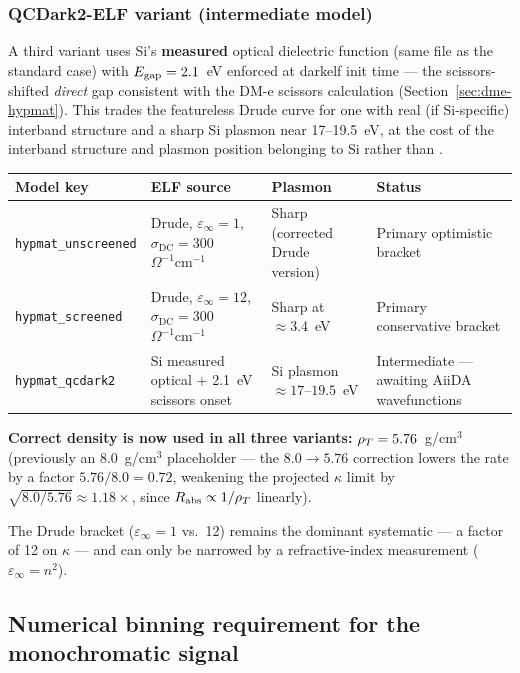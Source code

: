 \subsubsection{QCDark2-ELF variant (intermediate model)}

A third variant uses Si's \textbf{measured} optical dielectric function
(same file as the standard case) with $E_\mathrm{gap}=2.1$~eV enforced at darkelf
init time — the scissors-shifted \emph{direct} gap consistent with the
DM-e scissors calculation (Section~\ref{sec:dme-hypmat}). This trades the
featureless Drude curve for one with real (if Si-specific) interband
structure and a sharp Si plasmon near 17--19.5~eV, at the cost of the
interband structure and plasmon position belonging to Si rather than
\SrCdSb{}.

\begin{center}
\begin{tabular}{@{}p{2.8cm}p{5.3cm}p{2.7cm}p{2.7cm}@{}}
\toprule
Model key & ELF source & Plasmon & Status \\
\midrule
\texttt{hypmat\_unscreened} & Drude, $\varepsilon_\infty=1$,
  $\sigma_\mathrm{DC}=300$~$\Omega^{-1}\mathrm{cm}^{-1}$ & Sharp (corrected
  Drude version) & Primary optimistic bracket \\
\texttt{hypmat\_screened} & Drude, $\varepsilon_\infty=12$,
  $\sigma_\mathrm{DC}=300$~$\Omega^{-1}\mathrm{cm}^{-1}$ & Sharp at
  $\approx3.4$~eV & Primary conservative bracket \\
\texttt{hypmat\_qcdark2} & Si measured optical + 2.1~eV scissors onset &
  Si plasmon $\approx17$--$19.5$~eV & Intermediate — awaiting AiiDA
  wavefunctions \\
\bottomrule
\end{tabular}
\end{center}

\textbf{Correct density is now used in all three variants:}
$\rho_T=5.76$~g/cm$^3$ (previously an 8.0~g/cm$^3$ placeholder — the
$8.0\to5.76$ correction lowers the rate by a factor $5.76/8.0=0.72$,
weakening the projected $\kappa$ limit by $\sqrt{8.0/5.76}\approx1.18\times$,
since $R_\mathrm{abs}\propto1/\rho_T$ linearly).

The Drude bracket ($\varepsilon_\infty=1$ vs.\ 12) remains the dominant
systematic — a factor of 12 on $\kappa$ — and can only be narrowed by a
refractive-index measurement ($\varepsilon_\infty=n^2$).

\subsection{Numerical binning requirement for the monochromatic signal}
\label{sec:binning}

